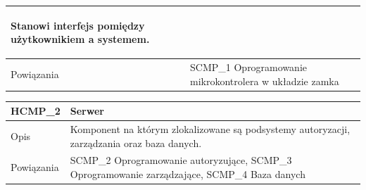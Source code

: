 \begin{table}
\begin{subtable}[c]{\textwidth}
\begin{tabular}{|p{2cm}|p{12cm}|}
\begin{itemize}
                                                            Stanowi interfejs pomiędzy użytkownikiem a systemem.
                                                    \end{itemize}  \\
                            \hline \cellcolor[gray]{0.8} Powiązania   & SCMP\_1 Oprogramowanie mikrokontrolera w układzie zamka    \\
                            \hline
                        \end{tabular}
                        \label{tbl:hcmp1}
                        \vspace{10mm}           
                    \end{subtable}
                \quad%
                    \begin{subtable}[c]{\textwidth}
                        \centering
                        \begin{tabular}{|p{2cm}|p{12cm}|}
                            \hline HCMP\_2      & \textbf{Serwer} \\
                            \hline \cellcolor[gray]{0.8} Opis         & Komponent na którym zlokalizowane są podsystemy autoryzacji, zarządzania oraz baza danych.  \\
                            \hline \cellcolor[gray]{0.8} Powiązania   & SCMP\_2 Oprogramowanie autoryzujące, SCMP\_3 Oprogramowanie zarządzające, SCMP\_4 Baza danych   \\
                            \hline
                        \end{tabular}
                        \label{tbl:hcmp2}     
                    \end{subtable}                
                    \label{tbl:hw_comp}
                \end{table}

